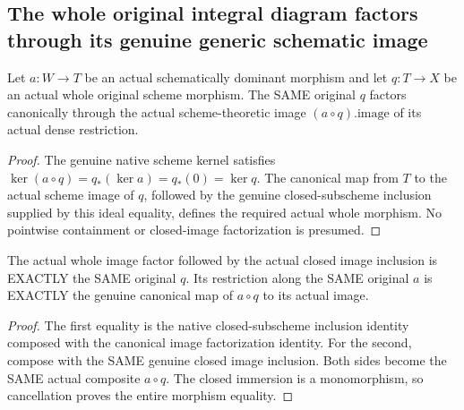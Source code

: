 \subsection{The whole original integral diagram factors through its genuine generic schematic image}

\begin{definition}
\label{scheme:dominant-image-factorization}
\leanok
Let $a:W\to T$ be an actual schematically dominant morphism and let
$q:T\to X$ be an actual whole original scheme morphism. The SAME original
$q$ factors canonically through the actual scheme-theoretic image
$(a\circ q).\mathrm{image}$ of its actual dense restriction.
\end{definition}
\begin{proof}
The genuine native scheme kernel satisfies
$\ker(a\circ q)=q_*(\ker a)=q_*(0)=\ker q$.
The canonical map from $T$ to the actual scheme image of $q$, followed by
the genuine closed-subscheme inclusion supplied by this ideal equality,
defines the required actual whole morphism. No pointwise containment or
closed-image factorization is presumed.
\end{proof}

\begin{theorem}
\label{scheme:dominant-image-factorization-triangles}
\leanok
{}
The actual whole image factor followed by the actual closed image inclusion
is EXACTLY the SAME original $q$. Its restriction along the SAME original
$a$ is EXACTLY the genuine canonical map of $a\circ q$ to its actual image.
\end{theorem}
\begin{proof}
The first equality is the native closed-subscheme inclusion identity
composed with the canonical image factorization identity. For the second,
compose with the SAME genuine closed image inclusion. Both sides become
the SAME actual composite $a\circ q$. The closed immersion is a monomorphism,
so cancellation proves the entire morphism equality.
\end{proof}

